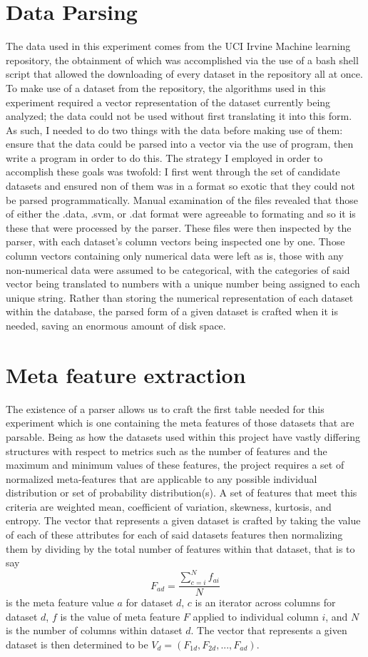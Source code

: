 \section{Data Parsing}
The data used in this experiment comes from the UCI Irvine Machine learning
repository, the obtainment of which was accomplished via the use of a bash
shell script that allowed the downloading of every dataset in the repository
all at once. To make use of a dataset from the repository, the algorithms used
in this experiment required a vector representation of the dataset currently
being analyzed; the data could not be used without first translating it into
this form. As such, I needed to do two things with the data before making use
of them: ensure that the data could be parsed into a vector via the use of program,
then write a program in order to do this. The strategy I employed in order to
accomplish these goals was twofold: I first went through the set of candidate
datasets and ensured non of them was in a format so exotic that they could not
be parsed programmatically. Manual examination of the files revealed that those
of either the .data, .svm, or .dat format were agreeable to formating and so it
is these that were processed by the parser. These files were then inspected by the
parser, with each dataset's column vectors being inspected one by one. Those
column vectors containing only numerical data were left as is, those with any
non-numerical data were assumed to be categorical, with the categories of said
vector being translated to numbers with a unique number being assigned to each
unique string. Rather than storing the numerical representation of each dataset
within the database, the parsed form of a given dataset is crafted when it is
needed, saving an enormous amount of disk space.

\section{Meta feature extraction}
The existence of a parser allows us to craft the first table needed for this
experiment which is one containing the meta features of those datasets that are
parsable. Being as how the datasets used within this project have vastly
differing structures with respect to metrics such as the number of features
and the maximum and minimum values of these features, the project requires a set
of normalized meta-features that are applicable to any possible individual
distribution or set of probability distribution(s). A set of features that meet
this criteria are weighted mean, coefficient of variation, skewness, kurtosis, and
entropy. The vector that represents a given dataset is crafted by taking the
value of each of these attributes for each of said datasets features then
normalizing them by dividing by the total number of features within that dataset,
that is to say
$$F_{ad} = \frac{\sum_{c=i}^{N}f_{ai}}{N}$$
is the meta feature value $a$ for dataset $d$, $c$ is an iterator across columns
for dataset $d$, $f$ is the value of meta feature $F$ applied to individual
column $i$, and $N$ is the number of columns within dataset $d$. The vector that
represents a given dataset is then determined to be
$V_d = (F_{1d}, F_{2d},..., F_{ad})$.

